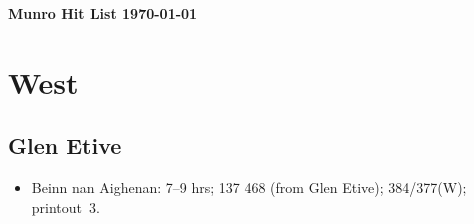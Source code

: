 \documentclass[12pt,a4paper]{article}
\begin{document}
\begin{center}
\Large\bf Munro Hit List
\large \today
\end{center}

\section{West}







\subsection*{Glen Etive}

%
\begin{itemize}

\item Beinn nan Aighenan: 7--9 hrs; 137 468 (from Glen Etive); 384/377(W);
  printout~3.

\end{itemize}






\end{document}
